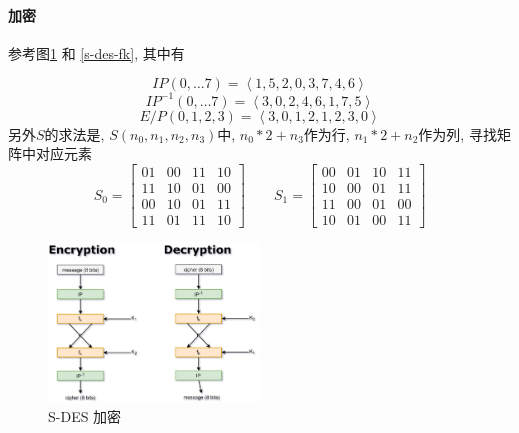 \documentclass{ctexart}
\begin{document}
\paragraph{加密}
    参考图\ref{s-des-enc} 和 \ref{s-des-fk}, 其中有\par
    \[IP(0,\ldots 7) = \left\langle 1, 5, 2, 0, 3, 7, 4, 6 \right\rangle\]
    \[IP^{-1}(0,\ldots7) = \left\langle 3, 0, 2, 4, 6, 1, 7, 5\right\rangle\]
    \[E/P(0, 1, 2, 3) = \left\langle 3, 0, 1, 2, 1, 2, 3, 0 \right\rangle\]
    另外$S$的求法是, $S(n_0, n_1, n_2, n_3)$中, $n_0*2 + n_3$作为行, $n_1*2+n_2$作为列, 寻找矩阵中对应元素\[
        S_0 = \begin{bmatrix}
            01 & 00 & 11 & 10\\
            11 & 10 & 01 & 00\\
            00 & 10 & 01 & 11\\
            11 & 01 & 11 & 10\end{bmatrix}\qquad
        S_1 = \begin{bmatrix}
            00 & 01 & 10 & 11\\
            10 & 00 & 01 & 11\\
            11 & 00 & 01 & 00\\
            10 & 01 & 00 & 11\end{bmatrix}
    \]
    \begin{figure}[ht!]
        \centering
        \includegraphics[width=0.5\textwidth]{s-des-enc.jpg}
        \caption{S-DES 加密}
        \label{s-des-enc}
    \end{figure}
\end{document}

